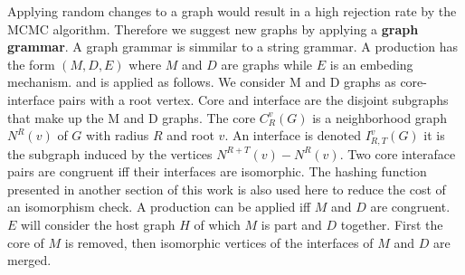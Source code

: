\documentclass{article}
\begin{document}
Applying random changes to a graph would result in a high rejection rate by the MCMC 
algorithm. Therefore we suggest new graphs by applying a \textbf{graph grammar}. 
A graph grammar is simmilar to a string grammar. A production has the form $(M,D,E)$ 
where $M$ and $D$ are graphs while $E$ is an embeding mechanism.
and is applied as follows. 
We consider M and D graphs as core-interface pairs with a root vertex. 
Core and interface are the disjoint subgraphs that make up the M and D graphs. 
The core $C^v_R(G)$ is a neighborhood graph $N^R(v)$ of $G$ with radius $R$ and root $v$.
An interface is denoted $I^v_{R,T}(G)$ it is the subgraph induced by the vertices $N^{R+T}(v) - 
N^{R}(v)$. Two core interaface pairs are congruent iff 
their interfaces are isomorphic. The hashing function presented in another section 
of this work is also used here to reduce the cost of an isomorphism check. 
A production can be applied iff $M$ and $D$ are congruent. $E$ will consider the 
host graph $H$ of which $M$ is part and $D$ together. First the core of $M$ is removed,
then isomorphic vertices of the interfaces of $M$ and $D$ are merged.
\end{document}
